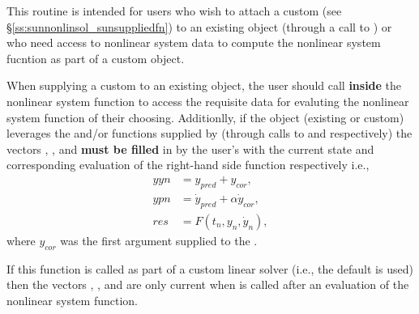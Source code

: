 {
  This routine is intended for users who wish to attach a custom
   (see \S\ref{ss:sunnonlinsol_sunsuppliedfn}) to an
  existing  object (through a call to
  ) or who need access to nonlinear system data to
  compute the nonlinear system fucntion as part of a custom
   object.

  When supplying a custom  to an existing
   object, the user should call
   \textbf{inside} the nonlinear system
  function to access the requisite data for evaluting the nonlinear system
  function of their choosing. Additionlly, if the  object
  (existing or custom) leverages the  and/or
   functions supplied by {\idas} (through calls to
   and  respectively)
  the vectors , , and  \textbf{must be filled} in by the
  user's  with the current state and corresponding
  evaluation of the right-hand side function respectively i.e.,
  \begin{align*}
    yyn &= y_{pred} + y_{cor}, \\
    ypn &= \dot{y}_{pred} + \alpha \dot{y}_{cor}, \\
    res &= F\left(t_{n}, y_n, \dot{y}_n\right),
  \end{align*}
  where $y_{cor}$ was the first argument supplied to the .

  If this function is called as part of a custom linear solver (i.e., the
  default  is used) then the vectors , ,
  and  are only current when  is called
  after an evaluation of the nonlinear system function.
}

